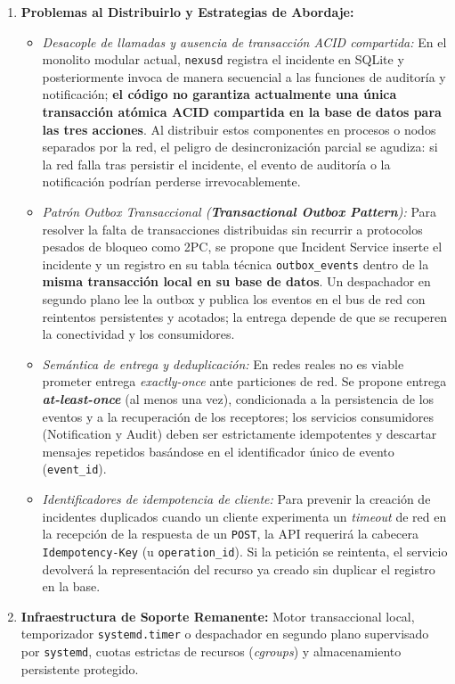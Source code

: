 \documentclass[10pt,a4paper]{article}
\begin{document}
\begin{enumerate}[leftmargin=*]
    \item \textbf{Problemas al Distribuirlo y Estrategias de Abordaje:}
    \begin{itemize}[leftmargin=*]
        \item \textit{Desacople de llamadas y ausencia de transacción ACID compartida:} En el monolito modular actual, \texttt{nexusd} registra el incidente en SQLite y posteriormente invoca de manera secuencial a las funciones de auditoría y notificación; \textbf{el código no garantiza actualmente una única transacción atómica ACID compartida en la base de datos para las tres acciones}. Al distribuir estos componentes en procesos o nodos separados por la red, el peligro de desincronización parcial se agudiza: si la red falla tras persistir el incidente, el evento de auditoría o la notificación podrían perderse irrevocablemente.
        \item \textit{Patrón Outbox Transaccional (\textbf{Transactional Outbox Pattern}):} Para resolver la falta de transacciones distribuidas sin recurrir a protocolos pesados de bloqueo como 2PC, se propone que Incident Service inserte el incidente y un registro en su tabla técnica \texttt{outbox\_events} dentro de la \textbf{misma transacción local en su base de datos}. Un despachador en segundo plano lee la outbox y publica los eventos en el bus de red con reintentos persistentes y acotados; la entrega depende de que se recuperen la conectividad y los consumidores.
        \item \textit{Semántica de entrega y deduplicación:} En redes reales no es viable prometer entrega \textit{exactly-once} ante particiones de red. Se propone entrega \textbf{\textit{at-least-once}} (al menos una vez), condicionada a la persistencia de los eventos y a la recuperación de los receptores; los servicios consumidores (Notification y Audit) deben ser estrictamente idempotentes y descartar mensajes repetidos basándose en el identificador único de evento (\texttt{event\_id}).
        \item \textit{Identificadores de idempotencia de cliente:} Para prevenir la creación de incidentes duplicados cuando un cliente experimenta un \textit{timeout} de red en la recepción de la respuesta de un \texttt{POST}, la API requerirá la cabecera \texttt{Idempotency-Key} (u \texttt{operation\_id}). Si la petición se reintenta, el servicio devolverá la representación del recurso ya creado sin duplicar el registro en la base.
    \end{itemize}
    \item \textbf{Infraestructura de Soporte Remanente:} Motor transaccional local, temporizador \texttt{systemd.timer} o despachador en segundo plano supervisado por \texttt{systemd}, cuotas estrictas de recursos (\textit{cgroups}) y almacenamiento persistente protegido.
\end{enumerate}
\end{document}
